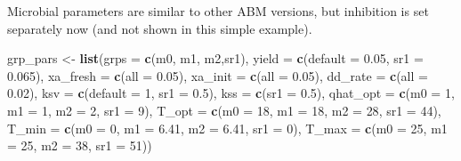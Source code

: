 \documentclass[
]{article}
\newenvironment{Shaded}{\begin{snugshade}}{\end{snugshade}}
\newcommand{\AttributeTok}[1]{\textcolor[rgb]{0.13,0.29,0.53}{#1}}
\newcommand{\DecValTok}[1]{\textcolor[rgb]{0.00,0.00,0.81}{#1}}
\newcommand{\FloatTok}[1]{\textcolor[rgb]{0.00,0.00,0.81}{#1}}
\newcommand{\FunctionTok}[1]{\textcolor[rgb]{0.13,0.29,0.53}{\textbf{#1}}}
\newcommand{\NormalTok}[1]{#1}
\newcommand{\OtherTok}[1]{\textcolor[rgb]{0.56,0.35,0.01}{#1}}
\newcommand{\StringTok}[1]{\textcolor[rgb]{0.31,0.60,0.02}{#1}}
\begin{document}
Microbial parameters are similar to other ABM versions, but inhibition
is set separately now (and not shown in this simple example).

\begin{Shaded}
\begin{Highlighting}[]
\NormalTok{grp\_pars }\OtherTok{\textless{}{-}} \FunctionTok{list}\NormalTok{(}\AttributeTok{grps =} \FunctionTok{c}\NormalTok{(}\StringTok{\textquotesingle{}m0\textquotesingle{}}\NormalTok{, }\StringTok{\textquotesingle{}m1\textquotesingle{}}\NormalTok{, }\StringTok{\textquotesingle{}m2\textquotesingle{}}\NormalTok{,}\StringTok{\textquotesingle{}sr1\textquotesingle{}}\NormalTok{),}
                 \AttributeTok{yield =} \FunctionTok{c}\NormalTok{(}\AttributeTok{default =} \FloatTok{0.05}\NormalTok{, }\AttributeTok{sr1 =} \FloatTok{0.065}\NormalTok{),}
                 \AttributeTok{xa\_fresh =} \FunctionTok{c}\NormalTok{(}\AttributeTok{all =} \FloatTok{0.05}\NormalTok{),}
                 \AttributeTok{xa\_init =} \FunctionTok{c}\NormalTok{(}\AttributeTok{all =} \FloatTok{0.05}\NormalTok{),}
                 \AttributeTok{dd\_rate =} \FunctionTok{c}\NormalTok{(}\AttributeTok{all =} \FloatTok{0.02}\NormalTok{),}
                 \AttributeTok{ksv =} \FunctionTok{c}\NormalTok{(}\AttributeTok{default =} \DecValTok{1}\NormalTok{, }\AttributeTok{sr1 =} \FloatTok{0.5}\NormalTok{),}
                 \AttributeTok{kss =} \FunctionTok{c}\NormalTok{(}\AttributeTok{sr1 =} \FloatTok{0.5}\NormalTok{),}
                 \AttributeTok{qhat\_opt =} \FunctionTok{c}\NormalTok{(}\AttributeTok{m0 =} \DecValTok{1}\NormalTok{, }\AttributeTok{m1 =} \DecValTok{1}\NormalTok{, }\AttributeTok{m2 =} \DecValTok{2}\NormalTok{, }\AttributeTok{sr1 =} \DecValTok{9}\NormalTok{),}
                 \AttributeTok{T\_opt =} \FunctionTok{c}\NormalTok{(}\AttributeTok{m0 =} \DecValTok{18}\NormalTok{, }\AttributeTok{m1 =} \DecValTok{18}\NormalTok{, }\AttributeTok{m2 =} \DecValTok{28}\NormalTok{, }\AttributeTok{sr1 =} \DecValTok{44}\NormalTok{),}
                 \AttributeTok{T\_min =} \FunctionTok{c}\NormalTok{(}\AttributeTok{m0 =} \DecValTok{0}\NormalTok{, }\AttributeTok{m1 =} \FloatTok{6.41}\NormalTok{, }\AttributeTok{m2 =} \FloatTok{6.41}\NormalTok{, }\AttributeTok{sr1 =} \DecValTok{0}\NormalTok{),}
                 \AttributeTok{T\_max =} \FunctionTok{c}\NormalTok{(}\AttributeTok{m0 =} \DecValTok{25}\NormalTok{, }\AttributeTok{m1 =} \DecValTok{25}\NormalTok{, }\AttributeTok{m2 =} \DecValTok{38}\NormalTok{, }\AttributeTok{sr1 =} \DecValTok{51}\NormalTok{))}
\end{Highlighting}
\end{Shaded}
\end{document}
